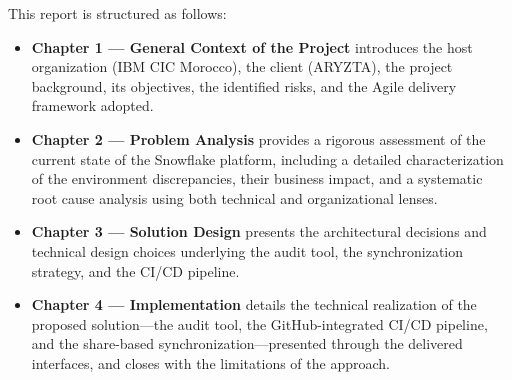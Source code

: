 \vspace{0.5cm}

\noindent This report is structured as follows:

\begin{itemize}
  \item \textbf{Chapter 1 --- General Context of the Project} introduces the host organization (IBM CIC Morocco), the client (ARYZTA), the project background, its objectives, the identified risks, and the Agile delivery framework adopted.
  \item \textbf{Chapter 2 --- Problem Analysis} provides a rigorous assessment of the current state of the Snowflake platform, including a detailed characterization of the environment discrepancies, their business impact, and a systematic root cause analysis using both technical and organizational lenses.
  \item \textbf{Chapter 3 --- Solution Design} presents the architectural decisions and technical design choices underlying the  audit tool, the synchronization strategy, and the CI/CD pipeline.
  \item \textbf{Chapter 4 --- Implementation} details the technical realization of the proposed solution---the audit tool, the GitHub-integrated CI/CD pipeline, and the share-based synchronization---presented through the delivered interfaces, and closes with the limitations of the approach.
\end{itemize}

\newpage
